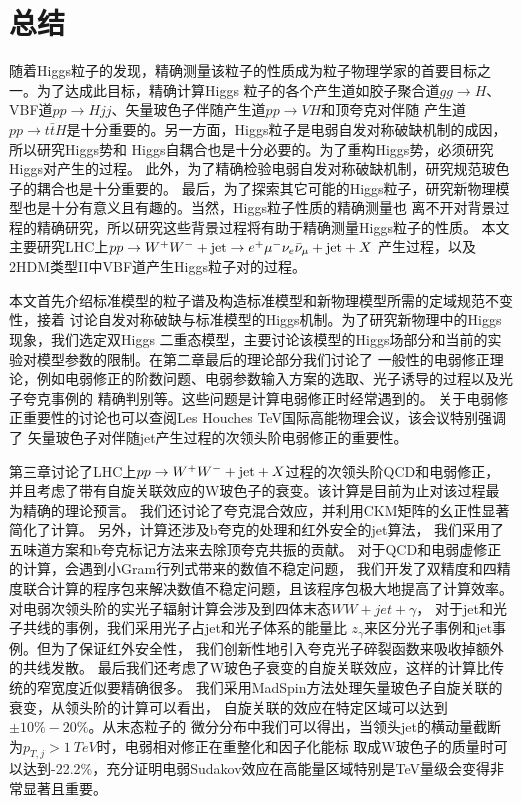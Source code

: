 ﻿
\chapter{总结}
\label{chap:conclusion}
随着Higgs粒子的发现，精确测量该粒子的性质成为粒子物理学家的首要目标之一。为了达成此目标，精确计算Higgs
粒子的各个产生道如胶子聚合道$gg\to H$、VBF道$pp\to Hjj$、矢量玻色子伴随产生道$pp\to VH$和顶夸克对伴随
产生道$pp\to t\bar{t}H$是十分重要的。另一方面，Higgs粒子是电弱自发对称破缺机制的成因，所以研究Higgs势和
Higgs自耦合也是十分必要的。为了重构Higgs势，必须研究Higgs对产生的过程。
此外，为了精确检验电弱自发对称破缺机制，研究规范玻色子的耦合也是十分重要的。
最后，为了探索其它可能的Higgs粒子，研究新物理模型也是十分有意义且有趣的。当然，Higgs粒子性质的精确测量也
离不开对背景过程的精确研究，所以研究这些背景过程将有助于精确测量Higgs粒子的性质。
本文主要研究LHC上$pp \to W^+W^-+{\rm jet} \to e^+ \mu^- \nu_e \bar \nu_{\mu}+{\rm jet}+X$
产生过程，以及2HDM类型II中VBF道产生Higgs粒子对的过程。

本文首先介绍标准模型的粒子谱及构造标准模型和新物理模型所需的定域规范不变性，接着
讨论自发对称破缺与标准模型的Higgs机制。为了研究新物理中的Higgs现象，我们选定双Higgs
二重态模型，主要讨论该模型的Higgs场部分和当前的实验对模型参数的限制。在第二章最后的理论部分我们讨论了
一般性的电弱修正理论，例如电弱修正的阶数问题、电弱参数输入方案的选取、光子诱导的过程以及光子夸克事例的
精确判别等。这些问题是计算电弱修正时经常遇到的。
关于电弱修正重要性的讨论也可以查阅Les Houches TeV国际高能物理会议\cite{LHwishlist}，该会议特别强调了
矢量玻色子对伴随jet产生过程的次领头阶电弱修正的重要性。

第三章讨论了LHC上$pp\to W^+W^-+{\rm jet}+X$过程的次领头阶QCD和电弱修正，
并且考虑了带有自旋关联效应的W玻色子的衰变。该计算是目前为止对该过程最为精确的理论预言。
我们还讨论了夸克混合效应，并利用CKM矩阵的幺正性显著简化了计算。
另外，计算还涉及b夸克的处理和红外安全的jet算法，
我们采用了五味道方案和b夸克标记方法来去除顶夸克共振的贡献。
对于QCD和电弱虚修正的计算，会遇到小Gram行列式带来的数值不稳定问题，
我们开发了双精度和四精度联合计算的程序包来解决数值不稳定问题，且该程序包极大地提高了计算效率。
对电弱次领头阶的实光子辐射计算会涉及到四体末态$WW+jet+\gamma$，
对于jet和光子共线的事例，我们采用光子占jet和光子体系的能量比
$z_{\gamma}$来区分光子事例和jet事例。但为了保证红外安全性，
我们创新性地引入夸克光子碎裂函数来吸收掉额外的共线发散。
最后我们还考虑了W玻色子衰变的自旋关联效应，这样的计算比传统的窄宽度近似要精确很多。
我们采用MadSpin方法处理矢量玻色子自旋关联的衰变，从领头阶的计算可以看出，
自旋关联的效应在特定区域可以达到$\pm 10\%-20\%$。从末态粒子的
微分分布中我们可以得出，当领头jet的横动量截断为$p_{T,j} > 1~TeV$时，电弱相对修正在重整化和因子化能标
取成W玻色子的质量时可以达到-22.2\%，充分证明电弱Sudakov效应在高能量区域特别是TeV量级会变得非常显著且重要。

